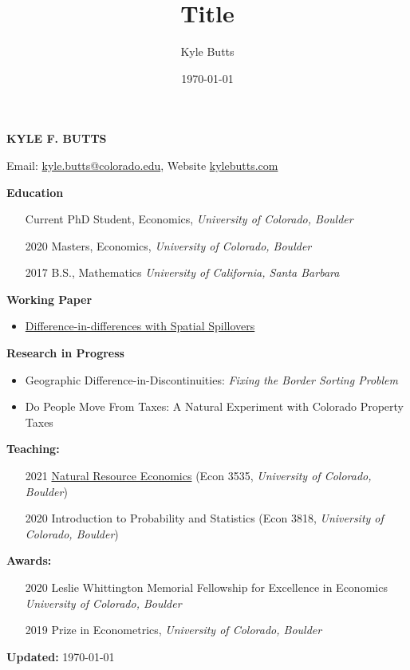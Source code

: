 \documentclass[11pt]{article}
\title{Title}
\date{\today}
\author{Kyle Butts}
\begin{document}
\begin{center}
    {\fontsize{18}{16} \normalfont \bf \color{navyblue} KYLE F. BUTTS}
    
    \vspace{5mm}
    Email: \href{mailto:kyle.butts@colorado.edu}{kyle.butts@colorado.edu}, Website \href{https://www.kylebutts.com}{kylebutts.com}
\end{center}

\vspace{10mm}
{\bf \color{navyblue} Education}
\begin{itemize}[leftmargin=1in]
    \item[Current] PhD Student, Economics, {\it University of Colorado, Boulder}
    \item[2020] Masters, Economics, {\it University of Colorado, Boulder}
    \item[2017] B.S., Mathematics {\it University of California, Santa Barbara}
\end{itemize}

{\bf \color{navyblue} Working Paper}

\begin{itemize}[leftmargin=1in]
    \item \href{https://kylebutts.com/files/Spillover.pdf}{Difference-in-differences with Spatial Spillovers}
\end{itemize}

{\bf \color{navyblue} Research in Progress}
\begin{itemize}[leftmargin=1in]
    \item Geographic Difference-in-Discontinuities: \textit{Fixing the Border Sorting Problem}
    
    \item Do People Move From Taxes: A Natural Experiment with Colorado Property Taxes
\end{itemize}





\vspace{5mm}
{\bf \color{navyblue} Teaching:}
\begin{itemize}[leftmargin=1in]
    \item[2021] \href{https://github.com/kylebutts/ECON3535_S2021}{Natural Resource Economics} (Econ 3535, {\it University of Colorado, Boulder})
    \item[2020] Introduction to Probability and Statistics (Econ 3818, {\it University of Colorado, Boulder})
\end{itemize}


\vspace{5mm}
{\bf \color{navyblue} Awards:}
\begin{itemize}[leftmargin=1in]
    \item[2020] Leslie Whittington Memorial Fellowship for Excellence in Economics {\it University of Colorado, Boulder}
    \item[2019] Prize in Econometrics, {\it University of Colorado, Boulder}
\end{itemize}

\vspace{10mm}
{\bf \color{navyblue} Updated:} \today
\end{document}
